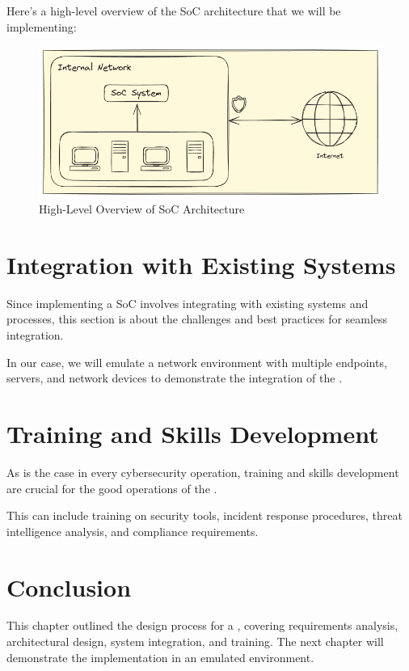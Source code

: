 Here's a high-level overview of the SoC architecture that we will be implementing:

\begin{figure}[H]
    \centering
    \includegraphics[width=1\textwidth]{src/assets/diagrams/soc-architecture-overview.png}
    \caption{High-Level Overview of SoC Architecture}
\end{figure}

\section{Integration with Existing Systems}

Since implementing a SoC involves integrating with existing systems and processes, this section is about the challenges and best practices for seamless integration.

In our case, we will emulate a network environment with multiple endpoints, servers, and network devices to demonstrate the integration of the .

\section{Training and Skills Development}

As is the case in every cybersecurity operation, training and skills development are crucial for the good operations of the .

This can include training on security tools, incident response procedures, threat intelligence analysis, and compliance requirements.


\setcounter{secnumdepth}{0} %
\section{Conclusion}
This chapter outlined the design process for a , covering requirements analysis, architectural design, system integration, and training.
The next chapter will demonstrate the  implementation in an emulated environment.
